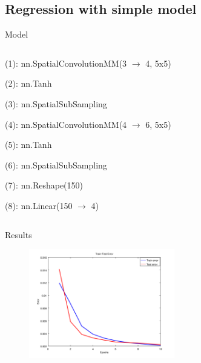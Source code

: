 \documentclass{beamer}
\begin{document}
\subsection{Regression with simple model}
\begin{frame}{Model}
	\begin{columns}[T]
		\begin{column}{0.60\textwidth}
			\footnotesize
			\color[rgb]{0,0,0.545098}
			(1): nn.SpatialConvolutionMM(3 $\rightarrow$ 4, 5x5)
			
  			(2): nn.Tanh
  			
  			(3): nn.SpatialSubSampling
  			
  			\color[rgb]{0.333333,0.419608,0.184314}
  			(4): nn.SpatialConvolutionMM(4 $\rightarrow$ 6, 5x5)
  			
  			(5): nn.Tanh
  			
  			(6): nn.SpatialSubSampling
  			
  			\color[rgb]{0.180392,0.545098,0.341176}
  			(7): nn.Reshape(150)
  			
  			(8): nn.Linear(150 $\rightarrow$ 4)
		\end{column}
		\begin{column}{0.40\textwidth}
		\end{column}
	\end{columns}
\end{frame}

\begin{frame}{Results}
\begin{figure}[h]
	\begin{center}
		\includegraphics[width=240px,height=180px]{img/small-network}
    \end{center}
\end{figure}

\end{frame}

\end{document}
